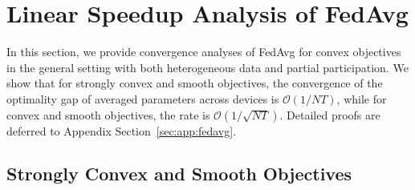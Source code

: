 


\section{Linear Speedup Analysis of FedAvg}
\label{sec:sgd}

In this section, we provide convergence analyses of FedAvg for convex objectives in the general setting with both heterogeneous data and partial
participation. We show that for strongly convex and smooth objectives,
the convergence of the optimality gap of averaged parameters across
devices is $\mathcal{O}(1/NT)$, while for convex and smooth
objectives, the rate is $\mathcal{O}(1/\sqrt{NT})$. 
Detailed proofs are deferred to Appendix Section~\ref{sec:app:fedavg}.

\subsection{Strongly Convex and Smooth Objectives}

